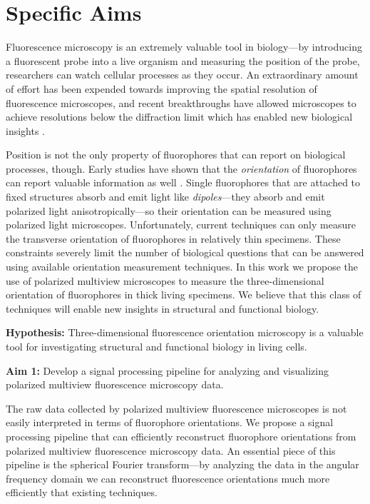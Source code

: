 \documentclass[11pt]{article}
\begin{document}
\section*{Specific Aims}
Fluorescence microscopy is an extremely valuable tool in
biology---by introducing a fluorescent probe into a live organism and measuring
the position of the probe, researchers can watch cellular processes as they
occur. An extraordinary amount of effort has been expended towards improving the
spatial resolution of fluorescence microscopes, and recent breakthroughs have
allowed microscopes to achieve resolutions below the diffraction limit which has
enabled new biological insights \cite{nobel}.

Position is not the only property of fluorophores that can report on biological
processes, though. Early studies have shown that the \textit{orientation} of
fluorophores can report valuable information as well \cite{weiss1999}. Single
fluorophores that are attached to fixed structures absorb and emit light like
\textit{dipoles}---they absorb and emit polarized light anisotropically---so
their orientation can be measured using polarized light
microscopes. Unfortunately, current techniques can only measure the transverse
orientation of fluorophores in relatively thin specimens. These constraints
severely limit the number of biological questions that can be answered using
available orientation measurement techniques. In this work we propose the use of
polarized multiview microscopes to measure the three-dimensional orientation of
fluorophores in thick living specimens. We believe that this class of techniques
will enable new insights in structural and functional biology.

\noindent\textbf{Hypothesis:} Three-dimensional fluorescence orientation microscopy is a
valuable tool for investigating structural and functional biology in living
cells.

\noindent\textbf{Aim 1:} Develop a signal processing pipeline for analyzing and visualizing polarized multiview fluorescence microscopy data.

The raw data collected by polarized multiview fluorescence microscopes is not
easily interpreted in terms of fluorophore orientations. We propose a signal
processing pipeline that can efficiently reconstruct fluorophore orientations
from polarized multiview fluorescence microscopy data. An essential piece of
this pipeline is the spherical Fourier transform---by analyzing the data in the
angular frequency domain we can reconstruct fluorescence orientations much more
efficiently that existing techniques.
\end{document}
